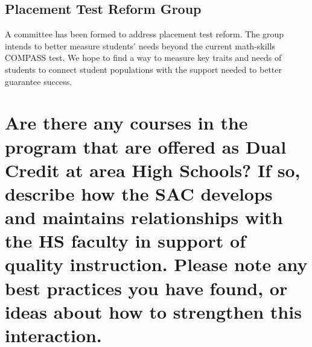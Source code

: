\subsection{Placement Test Reform Group}\label{other:sec:placementreform}
A committee has been formed to address placement test reform. The
group intends to better measure students' needs beyond the current math-skills
COMPASS test. We hope to find a way to measure key traits and needs of students
to connect student populations with the support needed to better guarantee
success.

\section[Present dual credit relationships]{Are there any courses in the program
that are offered as Dual Credit at area High Schools?  If so, describe how 
the SAC develops and maintains relationships with the HS faculty in support of
quality instruction. Please note any best practices you have found, or ideas
about how to strengthen this interaction.  }

